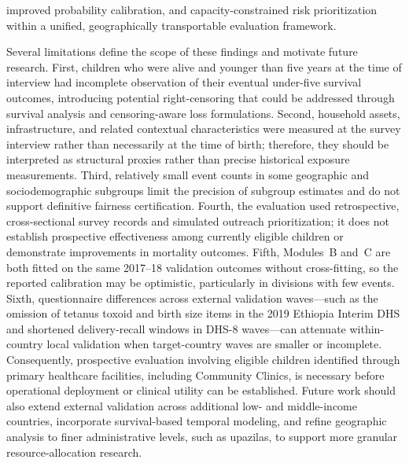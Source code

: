 \documentclass[a4paper,fleqn]{cas-sc}
\begin{document}
improved probability calibration, and capacity-constrained risk prioritization within a unified, geographically transportable evaluation framework.

Several limitations define the scope of these findings and motivate future research. First, children who were alive and younger than five years at the time of interview had incomplete observation of their eventual under-five survival outcomes, introducing potential right-censoring that could be addressed through survival analysis and censoring-aware loss formulations. Second, household assets, infrastructure, and related contextual characteristics were measured at the survey interview rather than necessarily at the time of birth; therefore, they should be interpreted as structural proxies rather than precise historical exposure measurements. Third, relatively small event counts in some geographic and sociodemographic subgroups limit the precision of subgroup estimates and do not support definitive fairness certification. Fourth, the evaluation used retrospective, cross-sectional survey records and simulated outreach prioritization; it does not establish prospective effectiveness among currently eligible children or demonstrate improvements in mortality outcomes. Fifth, Modules~B and~C are both fitted on the same 2017--18 validation outcomes without cross-fitting, so the reported calibration may be optimistic, particularly in divisions with few events. Sixth, questionnaire differences across external validation waves---such as the omission of tetanus toxoid and birth size items in the 2019 Ethiopia Interim DHS and shortened delivery-recall windows in DHS-8 waves---can attenuate within-country local validation when target-country waves are smaller or incomplete. Consequently, prospective evaluation involving eligible children identified through primary healthcare facilities, including Community Clinics, is necessary before operational deployment or clinical utility can be established. Future work should also extend external validation across additional low- and middle-income countries, incorporate survival-based temporal modeling, and refine geographic analysis to finer administrative levels, such as upazilas, to support more granular resource-allocation research.



\end{document}
